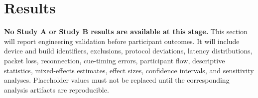 \section{Results}
\label{sec:results}

\textbf{No Study A or Study B results are available at this stage.} This section will report engineering validation before participant outcomes. It will include device and build identifiers, exclusions, protocol deviations, latency distributions, packet loss, reconnection, cue-timing errors, participant flow, descriptive statistics, mixed-effects estimates, effect sizes, confidence intervals, and sensitivity analyses. Placeholder values must not be replaced until the corresponding analysis artifacts are reproducible.
